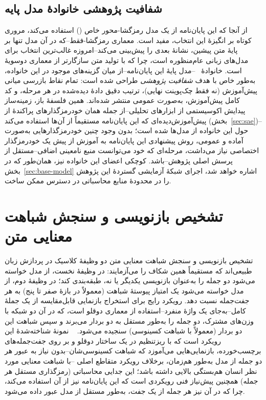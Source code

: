 \subsection{شفافیت پژوهشی خانوادهٔ مدل پایه}
از آنجا که این پایان‌نامه از یک مدل رمزگشا-محور
خاص
() استفاده می‌کند، مروری کوتاه بر انگیزهٔ این انتخاب، مفید است. معماری رمزگشا-فقط--که در آن مدل تنها بر پایهٔ متن پیشین، نشانهٔ بعدی را پیش‌بینی می‌کند--امروزه غالب‌ترین انتخاب برای مدل‌های زبانی عام‌منظوره است، چرا که با تولید متن سازگارتر از معماری دوسویهٔ
است. خانوادهٔ
~\cite{biderman2023pythia}--مدل پایهٔ این پایان‌نامه--از میان گزینه‌های موجود در این خانواده، به‌طور خاص با هدف \emph{شفافیت پژوهشی} طراحی شده است: تمام نقاط بازرسی میانی پیش‌آموزش (نه فقط چک‌پوینت نهایی)، ترتیب دقیق دادهٔ دیده‌شده در هر مرحله، و کد کامل پیش‌آموزش، به‌صورت عمومی منتشر شده‌اند. همین فلسفهٔ باز، زمینه‌ساز پیدایش اکوسیستمی از ابزارهای تحلیلی--از جمله همان خودرمزگذارهای پراکندهٔ از پیش‌آموزش‌دیده‌ای که این پایان‌نامه مستقیماً از آن‌ها استفاده می‌کند (بخش~\ref{sec:sae})--حول این خانواده از مدل‌ها شده است؛ بدون وجود چنین خودرمزگذارهایی به‌صورت آماده و عمومی، روش پیشنهادی این پایان‌نامه به آموزش از پیش یک خودرمزگذار اختصاصی نیاز می‌داشت، مرحله‌ای که خود می‌توانست منبع نامعینی اضافی--مستقل از پرسش اصلی پژوهش--باشد. کوچکی اعضای این خانواده نیز، همان‌طور که در بخش~\ref{sec:base-model} اشاره خواهد شد، اجرای شبکهٔ آزمایشی گستردهٔ این پژوهش را در محدودهٔ منابع محاسباتی در دسترس ممکن ساخت.

\section{تشخیص بازنویسی و سنجش شباهت معنایی متن}
\label{sec:lit-paraphrase}
تشخیص بازنویسی
و سنجش شباهت معنایی متن
دو وظیفهٔ کلاسیک در پردازش زبان طبیعی‌اند که مستقیماً همین شکاف را می‌آزمایند: در وظیفهٔ نخست، از مدل خواسته می‌شود دو جمله را به‌عنوان بازنویسی یکدیگر یا نه، طبقه‌بندی کند؛ در وظیفهٔ دوم، از مدل خواسته می‌شود یک امتیاز پیوستهٔ شباهت (معمولاً در بازهٔ صفر تا پنج) به هر جفت‌جمله نسبت دهد. رویکرد رایج برای استخراج بازنمایی قابل‌مقایسه از یک جملهٔ کامل--به‌جای یک واژهٔ منفرد--استفاده از معماری دوقلو
است، که در آن دو شبکه با وزن‌های مشترک، دو جمله را به‌طور مستقل به دو بردار می‌برند و سپس شباهت این دو بردار (معمولاً با شباهت کسینوسی) سنجیده می‌شود.
~\cite{reimers2019sbert}
نمونهٔ شناخته‌شدهٔ این رویکرد است که با ریزتنظیم
در یک ساختار دوقلو و بر روی جفت‌جمله‌های برچسب‌خورده، بازنمایی‌هایی می‌آموزد که شباهت کسینوسی‌شان--بدون نیاز به عبور هر دو جمله از مدل به‌طور هم‌زمان، برخلاف رویکرد متقاطع اصلی
--با شباهت معنایی مورد نظر انسان هم‌بستگی بالایی داشته باشد؛ این جدایی محاسباتی (رمزگذاری مستقل هر جمله) همچنین پیش‌نیاز فنی رویکردی است که این پایان‌نامه نیز از آن استفاده می‌کند، چرا که در آن نیز هر جمله از یک جفت، به‌طور مستقل از مدل عبور داده می‌شود.


